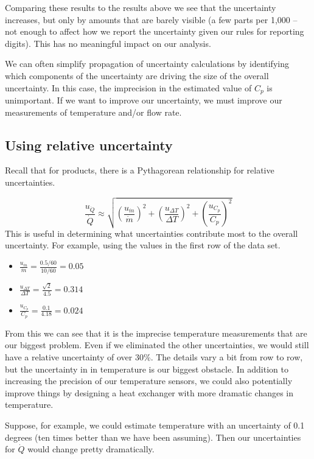\documentclass[twoside]{book}\usepackage[]{graphicx}\usepackage[]{xcolor}
\newcounter{example}[section]
\begin{document}
Comparing these results to the results above we see that the uncertainty
increases, but only by amounts that are barely visible (a few parts per
1,000 -- not enough to affect how we report the uncertainty given our rules
for reporting digits).  This has no meaningful impact on our analysis.

We can often simplify propagation of uncertainty calculations by identifying which 
components of the uncertainty are driving the size of the overall uncertainty.  In this case, 
the imprecision in the estimated value of $C_p$ is unimportant.  If we want to improve our
uncertainty, we must improve our measurements of temperature and/or flow rate.

\subsection{Using relative uncertainty}

Recall that for products, there is a Pythagorean relationship for relative uncertainties.

\[
\frac{u_{\dot Q}}{\dot Q} \approx 
\sqrt{ 
(\frac{u_{\dot m}}{\dot{m}})^2
+
(\frac{u_{\Delta T}}{\Delta T})^2
+
(\frac{u_{C_p}}{C_p})^2
}
\]
This is useful in determining what uncertainties contribute most to the overall uncertainty.
For example, using the values in the first row of the data set.
\begin{itemize}
	\item
		$\displaystyle \frac{u_{\dot{m}}}{\dot{m}} = \frac{0.5/60}{10/60} = 0.05$
	\item
		$\displaystyle \frac{u_{\Delta T}}{\Delta T} = \frac{\sqrt{2}}{4.5} = 0.314$
	\item
		$\displaystyle \frac{u_{C_p}}{C_p} = \frac{0.1}{4.18} = 0.024$
\end{itemize}
From this we can see that it is the imprecise temperature measurements that are our biggest
problem.  Even if we eliminated the other uncertainties, we would still have a relative uncertainty
of over $30$\%.   The details vary a bit from row to row, but the uncertainty in in temperature 
is our biggest obstacle.  In addition to increasing the precision of our temperature sensors, we could 
also potentially improve things by designing a heat exchanger with more dramatic changes in 
temperature.

Suppose, for example, we could estimate temperature with an uncertainty of 0.1 degrees (ten times 
better than we have been assuming).  Then our uncertainties for $\dot{Q}$ would change pretty
dramatically.
\end{document}

